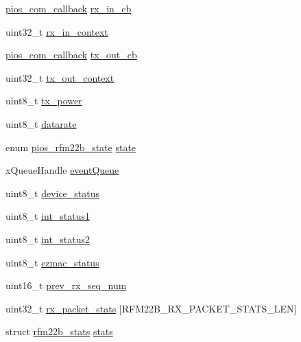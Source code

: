 \begin{DoxyCompactItemize}
\item 
\hyperlink{group___p_i_o_s___c_o_m_ga23f1888821f1f74a50c02adc459df597}{pios\-\_\-com\-\_\-callback} \hyperlink{structpios__rfm22b__dev_ac170322ec2f96932e0f060aa68b6bd12}{rx\-\_\-in\-\_\-cb}
\item 
uint32\-\_\-t \hyperlink{structpios__rfm22b__dev_a70fce9f445ae6ec87f5a559b89e82169}{rx\-\_\-in\-\_\-context}
\item 
\hyperlink{group___p_i_o_s___c_o_m_ga23f1888821f1f74a50c02adc459df597}{pios\-\_\-com\-\_\-callback} \hyperlink{structpios__rfm22b__dev_ab861d6c14abc749f20e45226bd606840}{tx\-\_\-out\-\_\-cb}
\item 
uint32\-\_\-t \hyperlink{structpios__rfm22b__dev_a6d55d5cf2cee09fb6e56c1f918dc31ea}{tx\-\_\-out\-\_\-context}
\item 
uint8\-\_\-t \hyperlink{structpios__rfm22b__dev_a3ca116567675ce2311161483fe4c9ff4}{tx\-\_\-power}
\item 
uint8\-\_\-t \hyperlink{structpios__rfm22b__dev_aff7a6133350534d9bdb99e8e4856dd6e}{datarate}
\item 
enum \hyperlink{group___p_i_o_s___r_f_m22_b_gaf31f5344b7afb099b3105bfff4debdca}{pios\-\_\-rfm22b\-\_\-state} \hyperlink{structpios__rfm22b__dev_a2725ce50c0aad0fae1e4cee8e29072f7}{state}
\item 
x\-Queue\-Handle \hyperlink{structpios__rfm22b__dev_a0c5971f25ea4ab50328105098e54eda7}{event\-Queue}
\item 
uint8\-\_\-t \hyperlink{structpios__rfm22b__dev_aa6ea2086a901b33a1f0f1535f378cdfc}{device\-\_\-status}
\item 
uint8\-\_\-t \hyperlink{structpios__rfm22b__dev_a9a3b8dfbadc7d813f3f9a2e9a40373f7}{int\-\_\-status1}
\item 
uint8\-\_\-t \hyperlink{structpios__rfm22b__dev_a59c62fb8b9b007e94890dc8a9d9c72e3}{int\-\_\-status2}
\item 
uint8\-\_\-t \hyperlink{structpios__rfm22b__dev_ae89edb5d4197faaeab67b5f0b010f5f8}{ezmac\-\_\-status}
\item 
uint16\-\_\-t \hyperlink{structpios__rfm22b__dev_a932f3bf8b3d7c94a5404fad6ff6801d4}{prev\-\_\-rx\-\_\-seq\-\_\-num}
\item 
uint32\-\_\-t \hyperlink{structpios__rfm22b__dev_acae5126a75716a87ed65f6d354df1d6a}{rx\-\_\-packet\-\_\-stats} \mbox{[}\-R\-F\-M22\-B\-\_\-\-R\-X\-\_\-\-P\-A\-C\-K\-E\-T\-\_\-\-S\-T\-A\-T\-S\-\_\-\-L\-E\-N\mbox{]}
\item 
struct \hyperlink{structrfm22b__stats}{rfm22b\-\_\-stats} \hyperlink{structpios__rfm22b__dev_abb8511852ba38b8de9c19aaae6a495f0}{stats}

\end{DoxyCompactItemize}
